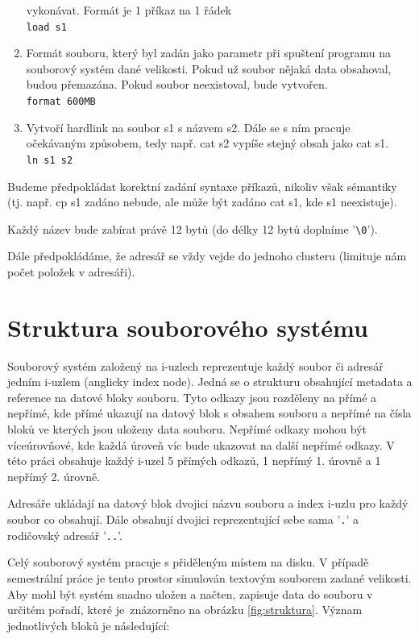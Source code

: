 \documentclass[12pt]{report}
\begin{document}
\begin{enumerate}
		vykonávat. Formát je 1 příkaz na 1 řádek
		\\ \texttt{load s1}
		\\
		\item Formát souboru, který byl zadán jako parametr při spuštení programu na souborový systém dané velikosti. Pokud už soubor nějaká data obsahoval, budou přemazána. Pokud soubor neexistoval, bude vytvořen.
		\\ \texttt{format 600MB}
		\\
		\item Vytvoří hardlink na soubor s1 s názvem s2. Dále se s ním pracuje očekávaným způsobem, tedy např. cat s2 vypíše stejný obsah jako cat s1.
		\\ \texttt{ln s1 s2}
		\\
	\end{enumerate}
	
	Budeme předpokládat korektní zadání syntaxe příkazů, nikoliv však sémantiky (tj. např. cp s1 zadáno nebude, ale může být zadáno cat s1, kde s1 neexistuje).
		
	Každý název bude zabírat právě 12 bytů (do délky 12 bytů doplníme '\texttt{\textbackslash0}').
	
	Dále předpokládáme, že adresář se vždy vejde do jednoho clusteru (limituje nám počet položek v adresáři).
		
		
	\chapter{Struktura souborového systému}
	Souborový systém založený na i-uzlech reprezentuje každý soubor či adresář jedním i-uzlem (anglicky index node). Jedná se o strukturu obsahující metadata a reference na datové bloky souboru. Tyto odkazy jsou rozděleny na přímé a nepřímé, kde přímé ukazují na datový blok s obsahem souboru a nepřímé na čísla bloků ve kterých jsou uloženy data souboru. Nepřímé odkazy mohou být víceúrovňové, kde každá úroveň víc bude ukazovat na další nepřímé odkazy. V této práci obsahuje každý i-uzel 5 přímých odkazů, 1 nepřímý 1. úrovně a 1 nepřímý 2. úrovně.
	
	Adresáře ukládají na datový blok dvojici názvu souboru a index i-uzlu pro každý soubor co obsahují. Dále obsahují dvojici reprezentující sebe sama '\texttt{.}' a rodičovský adresář '\texttt{..}'.
	
	Celý souborový systém pracuje s přiděleným místem na disku. V případě semestrální práce je tento prostor simulován textovým souborem zadané velikosti. Aby mohl být systém snadno uložen a načten, zapisuje data do souboru v určitém pořadí, které je~znázorněno na obrázku \ref{fig:struktura}. Význam jednotlivých bloků je následující:
	
\end{document}
